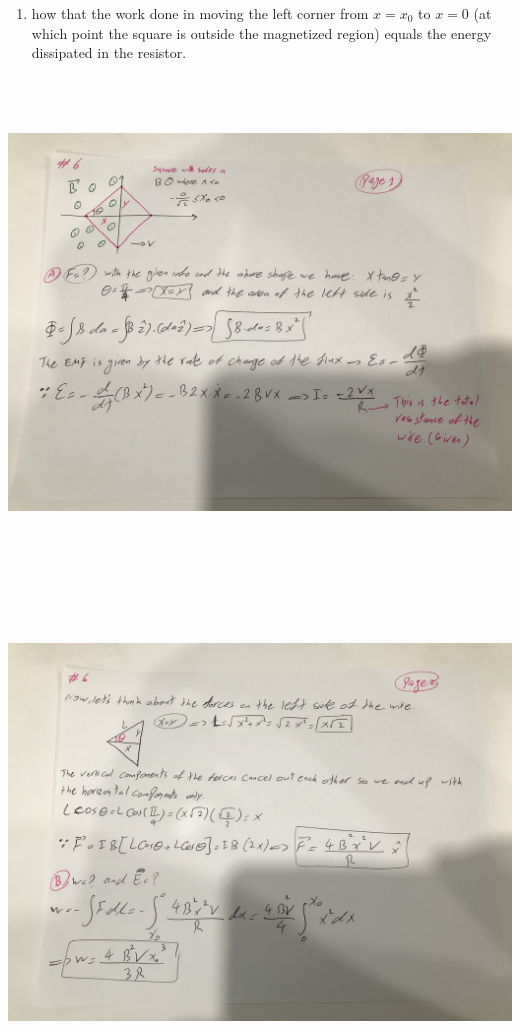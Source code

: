 \documentclass[fleqn]{article}
\begin{document}
\begin{enumerate}
\begin{enumerate}
      \item how that the work done in moving the left corner from $x=x_0$ to $x=0$ (at which 
      point the square is outside the magnetized region) equals the energy dissipated in the 
      resistor.
    \end{enumerate}

    \includegraphics[height=13cm, width=15cm]{6A.jpg}

    \pagebreak

    \includegraphics[height=13cm, width=15cm]{6B.jpg}


\end{enumerate}
\end{document}
